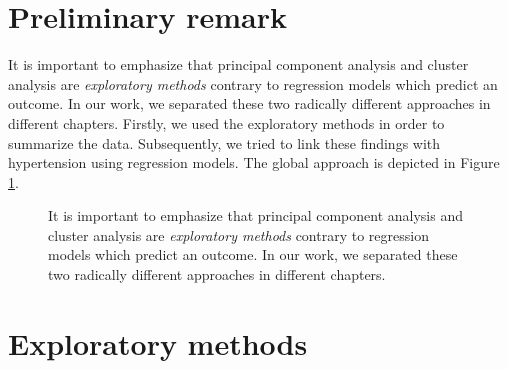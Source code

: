 
\section{Preliminary remark}
It is important to emphasize that principal component analysis and cluster analysis are \emph{exploratory methods} contrary to regression models which predict an outcome. In our work, we separated these two radically different approaches in different chapters. Firstly, we used the exploratory methods in order to summarize the data. Subsequently, we tried to link these findings with hypertension using regression models. The global approach is depicted in Figure \ref{fig:ga}.

\begin{figure}
\centering
\captionsetup{singlelinecheck = false, format= hang, justification=raggedright, font=small, labelsep=space}
  \label{fig:ga}
\begin{flushleft}
{\footnotesize  
It is important to emphasize that principal component analysis and cluster analysis are \emph{exploratory methods} contrary to regression models which predict an outcome. In our work, we separated these two radically different approaches in different chapters.}
\end{flushleft}
\end{figure}

\section{Exploratory methods}


